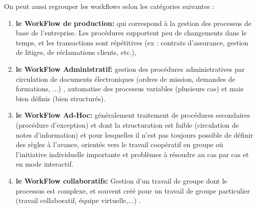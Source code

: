 On peut aussi regrouper les workflows selon les catégories suivantes :

\begin{enumerate}
\item \textbf{le WorkFlow de production:}
qui correspond à la gestion des processus de base de l'entreprise. Les procédures supportent peu de changements dans le temps, et les transactions sont répétitives (ex : contrats d'assurance, gestion de litiges, de réclamations clients, etc.),
\item \textbf{le WorkFlow Administratif:}
gestion des procédures administratives par circulation de documents électroniques (ordres de mission, demandes de formations, ...) , automatise des processus variables (plusieurs cas) et mais bien définis (bien structurés). 
\item \textbf{le WorkFlow Ad-Hoc:}
généralement traitement de procédures secondaires (procédure d’exception) et dont la structuration est faible (circulation de notes d'information) et pour lesquelles il n’est pas toujours possible de définir des règles à l’avance, orientés vers le travail coopératif en groupe où l'initiative individuelle importante et problèmes à résoudre au cas par cas et en mode interactif.

\item \textbf{le WorkFlow collaboratifs:}
 Gestion d'un travail de groupe dont le processus est complexe, et souvent créé pour un travail de groupe particulier (travail collaboratif, équipe virtuelle,...) .

\end{enumerate}

